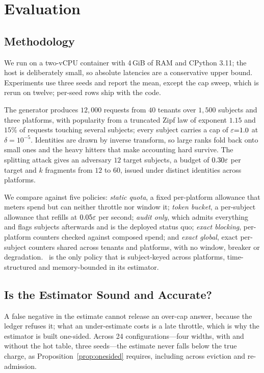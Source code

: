 \section{Evaluation}
\label{sec:eval}

\subsection{Methodology}
\label{sec:eval-method}

We run on a two-vCPU container with 4\,GiB of RAM and CPython 3.11; the host is
deliberately small, so absolute latencies are a conservative upper bound. Experiments
use three seeds and report the mean, except the cap sweep, which is rerun on twelve;
per-seed rows ship with the code.

The generator produces $12{,}000$ requests from $40$ tenants over $1{,}500$
subjects and three platforms, with popularity from a truncated Zipf law of exponent
$1.15$ and $15\%$ of requests touching several subjects; every subject carries a cap
of $\varepsilon{=}1.0$ at $\delta=10^{-5}$. Identities are drawn by inverse transform, so
large ranks fold back onto small ones and the heavy hitters that make accounting hard
survive.
The splitting attack gives an adversary $12$ target subjects, a budget of
$0.30\varepsilon$ per target and $k$ fragments from $12$ to $60$, issued under distinct
identities across platforms.

We compare against five policies: \emph{static quota}, a fixed per-platform
allowance that meters spend but can neither throttle nor window it; \emph{token
bucket}, a per-subject allowance that refills at $0.05\varepsilon$ per second; \emph{audit only}, which admits everything and
flags subjects afterwards and is the deployed status quo; \emph{exact blocking},
per-platform counters checked against composed spend; and \emph{exact global}, exact
per-subject counters shared across tenants and platforms, with no window, breaker or
degradation. \sys\ is the only
policy that is subject-keyed across platforms, time-structured and memory-bounded in
its estimator.

\subsection{Is the Estimator Sound and Accurate?}
\label{sec:eval-accuracy}

A false negative in the estimate cannot release an over-cap answer, because the
ledger refuses it; what an under-estimate costs is a late throttle, which is why
the estimator is built one-sided. Across 24 configurations---four widths, with and
without the hot table, three seeds---the estimate never falls below the true charge,
as Proposition~\ref{prop:onesided} requires, including across eviction and
re-admission.

